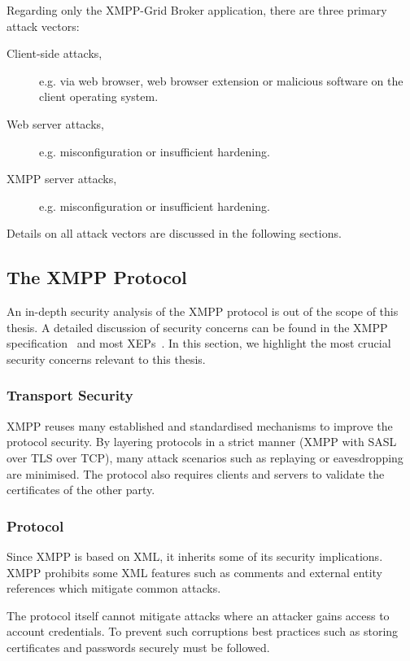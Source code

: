 Regarding only the XMPP-Grid Broker application, there are three primary attack vectors:

\begin{description}
    \item[Client-side attacks,] e.g. via web browser, web browser extension or malicious software on the client operating system.
    \item[Web server attacks,] e.g. misconfiguration or insufficient hardening.
    \item[XMPP server attacks,] e.g. misconfiguration or insufficient hardening.
\end{description}

Details on all attack vectors are discussed in the following sections.

\subsection{The XMPP Protocol}

An in-depth security analysis of the XMPP protocol is out of the scope of this thesis.
A detailed discussion of security concerns can be found in the XMPP specification~\cite{rfc6120} and most XEPs~\cite{xep-0060}\cite{xep-0248}.
In this section, we highlight the most crucial security concerns relevant to this thesis.

\subsubsection{Transport Security}

XMPP reuses many established and standardised mechanisms to improve the protocol security.
By layering protocols in a strict manner (XMPP with SASL over TLS over TCP), many attack scenarios such as replaying or eavesdropping are minimised.
The protocol also requires clients and servers to validate the certificates of the other party.~\cite{rfc7590}\cite{rfc6120}

\subsubsection{Protocol}

Since XMPP is based on XML, it inherits some of its security implications.
XMPP prohibits some XML features such as comments and external entity references which mitigate common attacks.~\cite{rfc6120}

The protocol itself cannot mitigate attacks where an attacker gains access to account credentials.
To prevent such corruptions best practices such as storing certificates and passwords securely must be followed.

